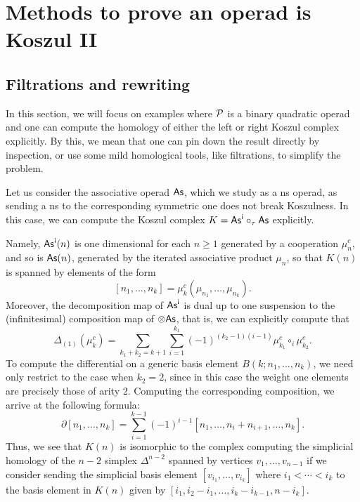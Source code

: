 

\section{Methods to prove an operad is Koszul II}\label{lecture:methods2}

\subsection{Filtrations and rewriting}

In this section, we will focus on examples where
${\mathcal{P}}$ is a binary quadratic operad and one can
compute the homology of either the left or
right Koszul complex explicitly. By this, we
mean that one can pin down the result directly
by inspection, or use some mild homological tools,
like filtrations, to simplify the problem.

\begin{example}
Let us consider the associative operad $\mathsf{As}$,
which we study as a ns operad, as sending a ns
to the corresponding symmetric one does not
break Koszulness. In this case, we can compute
the Koszul complex 
$K =\As^\antishriek\circ_\tau \As$ explicitly. 

Namely, $\As^\antishriek(n)$ is one dimensional
for each $n\geqslant 1$ generated by a cooperation
$\mu_n^c$, and so is $\mathsf{As}(n)$, generated by the
iterated associative product $\mu_n$,
so that $K(n)$ is spanned by elements of the form
\[
[n_1,\ldots,n_k] = 
	\mu_k^c(\mu_{n_1},\ldots,\mu_{n_k}).
\]
Moreover, the decomposition map of $\As^\antishriek$
is dual up to one suspension to the (infinitesimal)
composition map of $\otimes\mathsf{As}$, that is, we can
explicitly compute that
\[
\Delta_{(1)}(\mu_k^c) = 
 \sum_{k_1+k_2 = k+1}
 	\sum_{i=1}^{k_1}(-1)^{(k_2-1)(i-1)}
 		 \mu_{k_1}^c\circ_i \mu_{k_2}^c.
\]
To compute the differential on a generic basis element
$B(k;n_1,\ldots,n_k)$, we need only restrict to the
case when $k_2=2$, since in this case the weight
one elements are precisely those of arity $2$.
Computing the corresponding composition, we arrive
at the following formula:
\[
\partial [n_1,\ldots,n_k] = 
\sum_{i=1}^{k-1} 
(-1)^{i-1}[n_1,\ldots,n_i+n_{i+1},\ldots,n_k].
\]
Thus, we see that $K(n)$ is isomorphic to the
complex computing the simplicial homology
of the $n-2$ simplex $\Delta^{n-2}$ spanned
by vertices $v_1,\ldots,v_{n-1}$ if we consider
sending the simplicial basis element
$[v_{i_1},\ldots,v_{i_k}]$ where
$i_1 < \cdots < i_k$ to the basis element
in $K(n)$ given by
$[i_1,i_2-i_1,\ldots,i_k-i_{k-1},n-i_k]$.

 \end{example}

